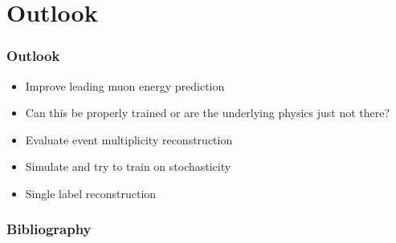 \documentclass[aspectratio=1610, 9pt]{beamer}
\begin{document}
\section{Outlook}
\begin{frame}
  \frametitle{Outlook}
  \begin{itemize}
    \item Improve leading muon energy prediction
    \item Can this be properly trained or are the underlying physics just not there?
    \item Evaluate event multiplicity reconstruction
    \item Simulate and try to train on stochasticity
    \item Single label reconstruction
  \end{itemize}
\end{frame}
\begin{frame}
  \frametitle{Bibliography}
  \printbibliography	
\end{frame}
\end{document}
